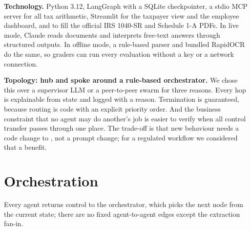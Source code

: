 \documentclass[9pt]{extarticle}
\newcommand{\code}[1]{\texttt{\detokenize{#1}}}
\begin{document}
\textbf{Technology.} Python 3.12, LangGraph with a SQLite checkpointer, a stdio MCP server for all tax arithmetic, Streamlit for the taxpayer view and the employee dashboard, and \code{pypdf} to fill the official IRS 1040-SR and Schedule 1-A PDFs. In live mode, Claude reads documents and interprets free-text answers through structured outputs. In offline mode, a rule-based parser and bundled RapidOCR do the same, so graders can run every evaluation without a key or a network connection.

\textbf{Topology: hub and spoke around a rule-based orchestrator.} We chose this over a supervisor LLM or a peer-to-peer swarm for three reasons. Every hop is explainable from state and logged with a reason. Termination is guaranteed, because routing is code with an explicit priority order. And the business constraint that no agent may do another's job is easier to verify when all control transfer passes through one place. The trade-off is that new behaviour needs a code change to \code{decide()}, not a prompt change; for a regulated workflow we considered that a benefit.

\section{Orchestration}

Every agent returns control to the orchestrator, which picks the next node from the current state; there are no fixed agent-to-agent edges except the extraction fan-in.
\end{document}
